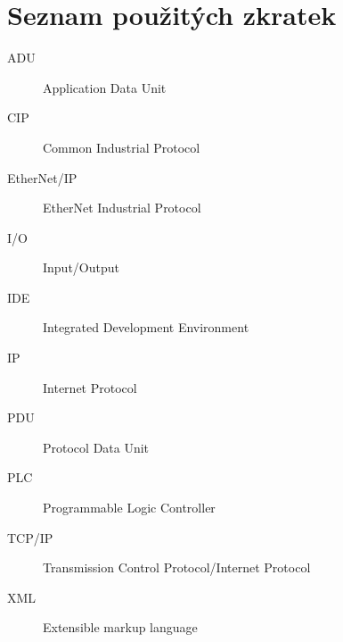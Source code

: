 \chapter{Seznam použitých zkratek}
\begin{description}
	\item[ADU] Application Data Unit
	\item[CIP] Common Industrial Protocol
	\item[EtherNet/IP] EtherNet Industrial Protocol
	\item[I/O] Input/Output
	\item[IDE] Integrated Development Environment 
	\item[IP] Internet Protocol 
	\item[PDU] Protocol Data Unit 
	\item[PLC] Programmable Logic Controller
	\item[TCP/IP] Transmission Control Protocol/Internet Protocol 
	\item[XML] Extensible markup language
\end{description}